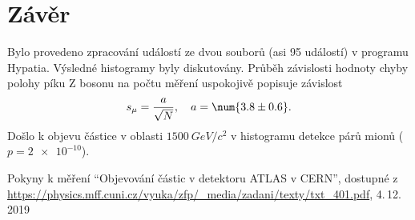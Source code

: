\documentclass{scirep}
\begin{document}
    \section*{Závěr}
    Bylo provedeno zpracování událostí ze dvou souborů (asi 95 událostí) v programu Hypatia.
    Výsledné histogramy byly diskutovány.
    Průběh závislosti hodnoty chyby polohy píku Z bosonu na počtu měření uspokojivě popisuje závislost
    \[ s_{\mu} = \frac{a}{\sqrt{N}},~~~ a = \num{3.8 \pm 0.6}. \]
    Došlo k objevu částice v oblasti $\SI{1500}{GeV/c^2}$ v histogramu detekce párů mionů ($p = \num{2e-10}$).

    \begin{thebibliography}{}

        Pokyny k měření ``Objevování částic v detektoru ATLAS v CERN'', dostupné z\\ \url{https://physics.mff.cuni.cz/vyuka/zfp/_media/zadani/texty/txt_401.pdf}, 4.\,12.\,2019

    \end{thebibliography}
\end{document}
